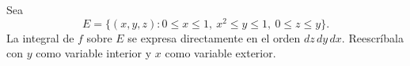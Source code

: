 Sea
\[
E=\{(x,y,z):0\leq x\leq1,\ x^2\leq y\leq1,\ 0\leq z\leq y\}.
\]
La integral de $f$ sobre $E$ se expresa directamente en el orden $dz\,dy\,dx$. Reescríbala con $y$ como variable interior y $x$ como variable exterior.
